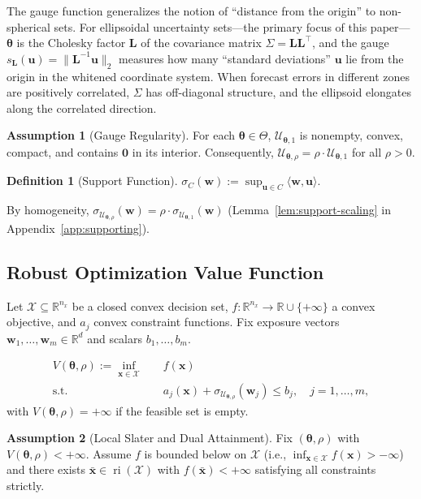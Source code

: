 \documentclass[11pt]{article}
\newcommand{\R}{\mathbb{R}}
\newcommand{\cU}{\mathcal{U}}
\newcommand{\cX}{\mathcal{X}}
\newcommand{\ip}[2]{\langle #1, #2 \rangle}
\newcommand{\btheta}{\bm{\theta}}
\newcommand{\bu}{\bm{u}}
\newcommand{\bw}{\bm{w}}
\newcommand{\bx}{\bm{x}}
\newcommand{\bL}{\bm{L}}
\DeclareMathOperator{\ri}{ri}
\theoremstyle{definition}
\newtheorem{definition}{Definition}
\newtheorem{assumption}{Assumption}
\begin{document}
The gauge function generalizes the notion of ``distance from the origin'' to non-spherical sets. For ellipsoidal uncertainty sets---the primary focus of this paper---$\btheta$ is the Cholesky factor $\bL$ of the covariance matrix $\Sigma = \bL\bL^\top$, and the gauge $s_{\bL}(\bu) = \|\bL^{-1}\bu\|_2$ measures how many ``standard deviations'' $\bu$ lie from the origin in the whitened coordinate system. When forecast errors in different zones are positively correlated, $\Sigma$ has off-diagonal structure, and the ellipsoid elongates along the correlated direction.

\begin{assumption}[Gauge Regularity]\label{asm:gauge}
For each $\btheta \in \Theta$, $\cU_{\btheta,1}$ is nonempty, convex, compact, and contains $\bm{0}$ in its interior. Consequently, $\cU_{\btheta,\rho} = \rho \cdot \cU_{\btheta,1}$ for all $\rho > 0$.
\end{assumption}

\begin{definition}[Support Function]
$\sigma_C(\bw) := \sup_{\bu \in C} \ip{\bw}{\bu}$.
\end{definition}

By homogeneity, $\sigma_{\cU_{\btheta,\rho}}(\bw) = \rho \cdot \sigma_{\cU_{\btheta,1}}(\bw)$ (Lemma~\ref{lem:support-scaling} in Appendix~\ref{app:supporting}).

\subsection{Robust Optimization Value Function}

Let $\cX \subseteq \R^{n_x}$ be a closed convex decision set, $f: \R^{n_x} \to \R \cup \{+\infty\}$ a convex objective, and $a_j$ convex constraint functions. Fix exposure vectors $\bw_1, \ldots, \bw_m \in \R^d$ and scalars $b_1, \ldots, b_m$.

\begin{equation}\label{eq:robust}
\begin{aligned}
V(\btheta,\rho) := \inf_{\bx \in \cX} \quad & f(\bx) \\
\text{s.t.} \quad & a_j(\bx) + \sigma_{\cU_{\btheta,\rho}}(\bw_j) \leq b_j, \quad j = 1,\ldots,m,
\end{aligned}
\end{equation}
with $V(\btheta,\rho)=+\infty$ if the feasible set is empty.

\begin{assumption}[Local Slater and Dual Attainment]\label{asm:slater}
Fix $(\btheta,\rho)$ with $V(\btheta,\rho)<+\infty$. Assume $f$ is bounded below on $\cX$ (i.e., $\inf_{\bx\in\cX}f(\bx)>-\infty$) and there exists $\bar{\bx}\in\ri(\cX)$ with $f(\bar{\bx})<+\infty$ satisfying all constraints strictly.
\end{assumption}
\end{document}
